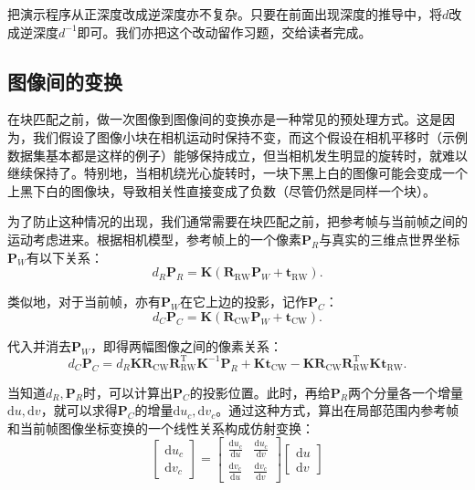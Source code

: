 把演示程序从正深度改成逆深度亦不复杂。只要在前面出现深度的推导中，将$d$改成逆深度$d^{-1}$即可。我们亦把这个改动留作习题，交给读者完成。

\subsection{图像间的变换}
在块匹配之前，做一次图像到图像间的变换亦是一种常见的预处理方式。这是因为，我们假设了图像小块在相机运动时保持不变，而这个假设在相机平移时（示例数据集基本都是这样的例子）能够保持成立，但当相机发生明显的旋转时，就难以继续保持了。特别地，当相机绕光心旋转时，一块下黑上白的图像可能会变成一个上黑下白的图像块，导致相关性直接变成了负数（尽管仍然是同样一个块）。

为了防止这种情况的出现，我们通常需要在块匹配之前，把参考帧与当前帧之间的运动考虑进来。根据相机模型，参考帧上的一个像素$\bm{P}_R$与真实的三维点世界坐标$\bm{P}_W$有以下关系：
\begin{equation}
d_R {\bm{P}_R} = \bm{K} \left( {{\bm{R}_{\mathrm{RW}}}{\bm{P}_W} + {\bm{t}_{\mathrm{RW}}}} \right).
\end{equation}

类似地，对于当前帧，亦有$\bm{P}_W$在它上边的投影，记作$\bm{P}_C$：
\begin{equation}
d_C {\bm{P}_C} = \bm{K} \left( {{\bm{R}_{\mathrm{CW}}}{\bm{P}_W} + {\bm{t}_{\mathrm{CW}}}} \right).
\end{equation}

代入并消去$\bm{P}_W$，即得两幅图像之间的像素关系：
\begin{equation}
d_C {\bm{P}_C} = d_R \bm{K} \bm{R}_{\mathrm{CW}} \bm{R}_{\mathrm{RW}}^\mathrm{T} \bm{K}^{-1} \bm{P}_R + \bm{K} \bm{t}_{\mathrm{CW}} - \bm{K} \bm{R}_{\mathrm{CW}} \bm{R}_{\mathrm{RW}}^\mathrm{T} \bm{K} \bm{t}_{\mathrm{RW}}.
\end{equation}

当知道$d_R, \bm{P}_R$时，可以计算出$\bm{P}_C$的投影位置。此时，再给$\bm{P}_R$两个分量各一个增量$\mathrm{d}u, \mathrm{d}v$，就可以求得$\bm{P}_C$的增量$\mathrm{d}u_c, \mathrm{d}v_c$。通过这种方式，算出在局部范围内参考帧和当前帧图像坐标变换的一个线性关系构成仿射变换：
\begin{equation}
\left[ \begin{array}{l}
\mathrm{d}u_c\\
\mathrm{d}v_c
\end{array} \right] = \left[ {\begin{array}{*{20}{c}}
	{\frac{{\mathrm{d}u_c}}{{\mathrm{d}u}}}&{\frac{{\mathrm{d}u_c}}{{\mathrm{d}v}}}\\
	{\frac{{\mathrm{d}v_c}}{{\mathrm{d}u}}}&{\frac{{\mathrm{d}v_c}}{{\mathrm{d}v}}}
	\end{array}} \right]\left[ \begin{array}{l}
\mathrm{d}u\\
\mathrm{d}v
\end{array} \right]
\end{equation}

